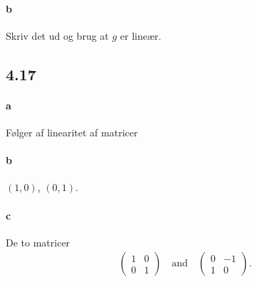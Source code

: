 			\paragraph{b} Skriv det ud og brug at $g$ er lineær.

		\subsection{4.17}

			\paragraph{a} Følger af linearitet af matricer

			\paragraph{b} $(1,0)$, $(0,1)$.

			\paragraph{c} De to matricer 
				\begin{align*}
					\left(\begin{array}{rr} {1} & {0} \\ {0} & {1} \end{array}\right) \quad \text{and} \quad \left(\begin{array}{rr} {0} & {-1} \\ {1} & {0} \end{array}\right).
				\end{align*} 


